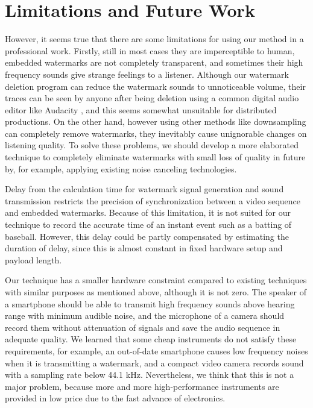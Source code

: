 \section{Limitations and Future Work}
However, it seems true that there are some limitations for using our method in a professional work.
Firstly, still in most cases they are imperceptible to human, embedded watermarks are not completely transparent, and sometimes their high frequency sounds give strange feelings to a listener.
Although our watermark deletion program can reduce the watermark sounds to unnoticeable volume, their traces can be seen by anyone after being deletion using a common digital audio editor like Audacity \cite{audacity}, and this seems somewhat unsuitable for distributed productions.
On the other hand, however using other methods like downsampling can completely remove watermarks, they inevitably cause unignorable changes on listening quality.
To solve these problems, we should develop a more elaborated technique to completely eliminate watermarks with small loss of quality in future by, for example, applying existing noise canceling technologies.

Delay from the calculation time for watermark signal generation and sound transmission restricts the precision of synchronization between a video sequence and embedded watermarks.
Because of this limitation, it is not suited for our technique to record the accurate time of an instant event such as a batting of baseball.
However, this delay could be partly compensated by estimating the duration of delay, since this is almost constant in fixed hardware setup and payload length.

Our technique has a smaller hardware constraint compared to existing techniques with similar purposes as mentioned above, although it is not zero.
The speaker of a smartphone should be able to transmit high frequency sounds above hearing range with minimum audible noise, and the microphone of a camera should record them without attenuation of signals and save the audio sequence in adequate quality.
We learned that some cheap instruments do not satisfy these requirements, for example, an out-of-date smartphone causes low frequency noises when it is transmitting a watermark, and a compact video camera records sound with a sampling rate below 44.1 kHz.
Nevertheless, we think that this is not a major problem, because more and more high-performance instruments are provided in low price due to the fast advance of electronics.
